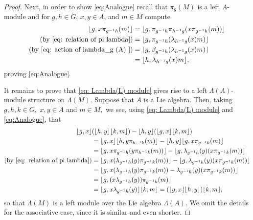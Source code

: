 \documentclass[11pt]{amsart}
\numberwithin{equation}{section}
\theoremstyle{definition}
\theoremstyle{remark}
\begin{document}
\begin{proof}
    Next, in order to show \eqref{eq:Analogue} recall that   $\pi _g (M)$ is a left $A$-module and for $g, h \in G$, $x, y \in A$, and $m \in M$ compute
    \begin{align*}
        \lfloor g, x \pi_{g^{-1}h}(m) \rfloor 
        &= \lfloor g, \pi_{g^{-1}h} \pi_{h^{-1}g}(x \pi_{g^{-1}h}(m)) \rfloor  \\
        (\text{by }\eqref{eq: relation of pi lambda})&=\lfloor g, \pi_{g^{-1}h}(\lambda_{h^{-1}g}(x) m) \rfloor \\
        (\text{by }\eqref{eq: action of lambda_g (A) })&=\lfloor g, \beta_{g^{-1}h}(\lambda_{h^{-1}g}(x) m) \rfloor \\
        &= \lfloor h, \lambda_{h^{-1}g}(x) m \rfloor,
    \end{align*}
    proving  \eqref{eq:Analogue}.

    It remains to prove that  \eqref{eq: Lambda(L) module} gives rise to a left $\Lambda(A)$-module structure   on $\Lambda(M).$ Suppose  that $A$  is a Lie algebra. Then, taking $g,h,k \in G,$ $x,y \in A$ and $m \in M,$ we see, using \eqref{eq: Lambda(L) module} and \eqref{eq:Analogue}, that  
    \begin{align*}
        \lfloor g, x  \rfloor & (\lfloor h, y  \rfloor  \lfloor k, m  \rfloor)
        - \lfloor h, y  \rfloor (\lfloor g, x  \rfloor \lfloor k, m  \rfloor) \\
        &= \lfloor g, x  \rfloor \lfloor h,y  \pi_{h^{-1}k} (m) \rfloor - \lfloor h, y  \rfloor \lfloor g,x  \pi_{g^{-1}k} (m) \rfloor\\ 
        &= \lfloor g, x \pi_{g^{-1}h} (y  \pi_{h^{-1}k} (m)  ) \rfloor -  \lfloor g, \lambda_{g^{-1}h} (y) (x \pi_{g^{-1}k} (m)  ) \rfloor \\
        (\text{by }\eqref{eq: relation of pi lambda})&=  \lfloor g, x ( \lambda_{g^{-1}h} (y ) \pi_{g^{-1}k} (m)  ) \rfloor -  \lfloor g, \lambda_{g^{-1}h} (y) (x \pi_{g^{-1}k} (m)  ) \rfloor\\
        &= \lfloor g, x ( \lambda_{g^{-1}h} (y ) \pi_{g^{-1}k} (m)  )  -   \lambda_{g^{-1}h} (y) (x \pi_{g^{-1}k} (m)  ) \rfloor\\
        &= \lfloor g, (x  \lambda_{g^{-1}h} (y )) \pi_{g^{-1}k} (m)   \rfloor \\
        &= \lfloor g, x  \lambda_{g^{-1}h} (y )\rfloor  \lfloor k, m \rfloor =  
        (\lfloor g, x  \rfloor    \lfloor h, y  \rfloor )   \lfloor k, m  \rfloor ,
    \end{align*}
    so that $\Lambda(M)$ is a left module over the Lie algebra $\Lambda(A).$
    We omit the details for the associative case, since it is similar and even shorter.
\end{proof}
 
\end{document}
